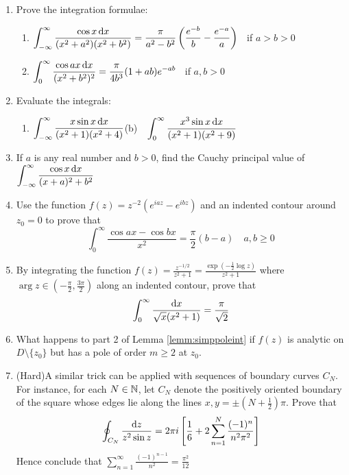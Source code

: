 \begin{exercises*}
\begin{enumerate}
	

	
  \item Prove the integration formulae:
  \begin{enumerate}
    \item $\displaystyle\int_{-\infty}^\infty \frac{\cos x\,{\mathrm{d} x}}{(x^2+a^2)(x^2+b^2)} =\frac\pi{a^2-b^2}\left(\frac{e^{-b}}b-\frac{e^{-a}}a\right)$ \ if $a>b>0$
    
    
    \item $\displaystyle\int_{0}^\infty \frac{\cos ax\,{\mathrm{d} x}}{(x^2+b^2)^2} =\frac\pi{4b^3}(1+ab)e^{-ab}$ \ if $a,b>0$
    
	\end{enumerate}
	
	\item Evaluate the integrals:
  \begin{enumerate}
    \item $\displaystyle\int_{-\infty}^\infty \frac{x\sin x\,{\mathrm{d} x}}{(x^2+1)(x^2+4)}$\qquad (b)\ \ $\displaystyle\int_{0}^\infty \frac{x^3\sin x\,{\mathrm{d} x}}{(x^2+1)(x^2+9)}$
	\end{enumerate}
	
	\item If $a$ is any real number and $b>0$, find the Cauchy principal value of $\displaystyle\int_{-\infty}^\infty\frac{\cos x\,{\mathrm{d} x}}{(x+a)^2+b^2}$
	
	\item Use the function $f(z)=z^{-2}(e^{iaz}-e^{ibz})$ and an indented contour around $z_0=0$ to prove that
	\[\int_0^\infty \frac{\cos ax-\cos bx}{x^2} =\frac\pi 2(b-a)\quad a,b\ge 0\]
	
	\item By integrating the function $f(z)=\frac{z^{-1/2}}{z^2+1}=\frac{\exp(-\frac 12\log z)}{z^2+1}$ where $\arg z\in(-\frac\pi 2,\frac{3\pi}2)$ along an indented contour, prove that
	\[\int_0^\infty \frac{{\mathrm{d} x}}{\sqrt x(x^2+1)} =\frac\pi{\sqrt 2}\]
  
  \item What happens to part 2 of Lemma \ref{lemm:simppoleint} if $f(z)$ is analytic on $D\setminus\{z_0\}$ but has a pole of order $m\ge 2$ at $z_0$.
  
  

	\item (Hard)\quad A similar trick can be applied with sequences of boundary curves $C_N$. For instance, for each $N\in\mathbb{N}$, let $C_N$ denote the positively oriented boundary of the square whose edges lie along the lines $x,y=\pm\left(N+\frac 12\right)\pi$. Prove that
  \[\oint_{C_N}\frac{{\mathrm{d} z}}{z^2\sin z}=2\pi i\left[\frac 16+2\sum_{n=1}^N\frac{(-1)^n}{n^2\pi^2}\right]\]
  Hence conclude that $\sum\limits_{n=1}^\infty\frac{(-1)^{n-1}}{n^2}=\frac{\pi^2}{12}$
\end{enumerate}
\end{exercises*}
